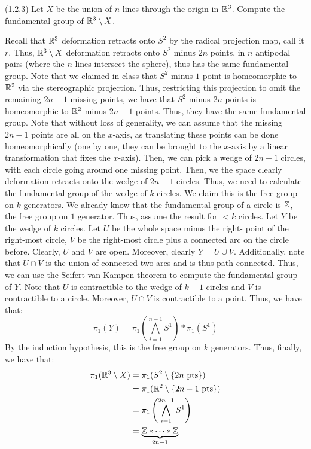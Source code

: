 \documentclass[12pt]{article}
\begin{document}
\begin{problem}{5}
    (1.2.3) Let $X$ be the union of $n$ lines through the origin in $\mathbb R^3$. Compute the fundamental group of $\mathbb R^3 \setminus X$. 
\end{problem}
\begin{solution}
    Recall that $\mathbb R^3$ deformation retracts onto $S^2$ by the radical projection map, call it $r$. Thus, $\mathbb R^3 \setminus X$ deformation retracts onto $S^2$ minus $2n$ points, in $n$ antipodal pairs (where the $n$ lines intersect the sphere), thus has the same fundamental group. \bbni
    Note that we claimed in class that $S^2$ minus $1$ point is homeomorphic to $\mathbb R^2$ via the stereographic projection. Thus, restricting this projection to omit the remaining $2n-1$ missing points, we have that $S^2$ minus $2n$ points is homeomorphic to $\mathbb R^2$ minus $2n-1$ points. Thus, they have the same fundamental group. \bbni    
    Note that without loss of generality, we can assume that the missing $2n-1$ points are all on the $x$-axis, as translating these points can be done homeomorphically (one by one, they can be brought to the $x$-axis by a linear transformation that fixes the $x$-axis). Then, we can pick a wedge of $2n-1$ circles, with each circle going around one missing point. Then, we the space clearly deformation retracts onto the wedge of $2n-1$ circles. \bbni
    Thus, we need to calculate the fundamental group of the wedge of $k$ circles. We claim this is the free group on $k$ generators. We already know that the fundamental group of a circle is $\mathbb Z$, the free group on $1$ generator. Thus, assume the result for $<k$ circles. \bbni 
    Let $Y$ be the wedge of $k$ circles. Let $U$ be the whole space minus the right- point of the right-most circle, $V$ be the right-most circle plus a connected arc on the circle before. Clearly, $U$ and $V$ are open. Moreover, clearly $Y = U \cup V$. \bbni
    Additionally, note that $U \cap V$ is the union of connected two-arcs and is thus path-connected. Thus, we can use the Seifert van Kampen theorem to compute the fundamental group of $Y$. \bbni
    Note that $U$ is contractible to the wedge of $k-1$ circles and $V$ is contractible to a circle. Moreover, $U \cap V$ is contractible to a point. Thus, we have that: 
    \[\pi_1(Y) = \pi_1\left(\bigwedge_{i=1}^{n-1} S^1\right) * \pi_1(S^1) \]
    By the induction hypothesis, this is the free group on $k$ generators. \bbni
    Thus, finally, we have that:
    \begin{align*}
        \pi_1(\mathbb R^3 \setminus X) &= \pi_1(S^2 \setminus \{2n \text{ pts}\})\\  
        &= \pi_1(\mathbb R^2 \setminus\{2n-1 \text{ pts}\}) \\
        &= \pi_1\left(\bigwedge_{i=1}^{2n-1} S^1\right) \\
        &= \underbrace{\mathbb Z * \cdots * \mathbb Z}_{2n-1}
    \end{align*}
\end{solution}
\newpage
\end{document}
